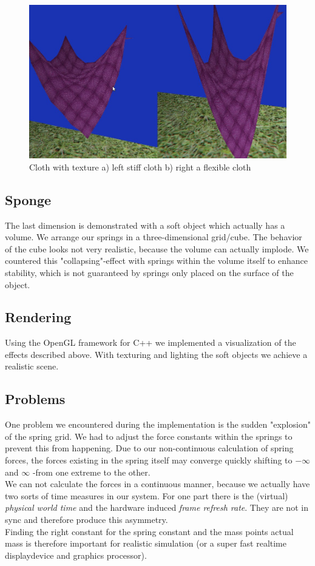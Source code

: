 \documentclass[11pt]{article}
\begin{document}
\begin{figure}[h]
\centering
\includegraphics[scale=0.3]{cloth-stiffness.jpg}
\caption{Cloth with texture a) left stiff cloth b) right a flexible cloth}
\label{fig:cloth-stif}
\end{figure}


\subsection{Sponge}
The last dimension is demonstrated with a soft object which actually has a volume. We arrange our springs in a three-dimensional grid/cube. The behavior of the cube looks not very realistic, because the volume can actually implode. We countered this "collapsing"-effect with springs within the volume itself to enhance stability, which is not guaranteed by springs only placed on the surface of the object.
\subsection{Rendering}
Using the OpenGL framework for C++ we implemented a visualization of the effects described above. With texturing and lighting the soft objects we achieve a realistic scene.
\subsection{Problems}
One problem we encountered during the implementation is the sudden "explosion" of the spring grid. We had to adjust the force constants within the springs to prevent this from happening. Due to our non-continuous calculation of spring forces, the forces existing in the spring itself may converge quickly shifting to $-\infty$ and $\infty$ -from one extreme to the other.\\[1em]
We can not calculate the forces in a continuous manner, because we actually have two sorts of time measures in our system. For one part there is the (virtual) \textit{physical world time} and the hardware induced \textit{frame refresh rate}. They are not in sync and therefore produce this asymmetry.\\[1em]
Finding the right constant for the spring constant and the mass points actual mass is therefore important for realistic simulation (or a super fast realtime displaydevice and graphics processor).
%
\end{document}
